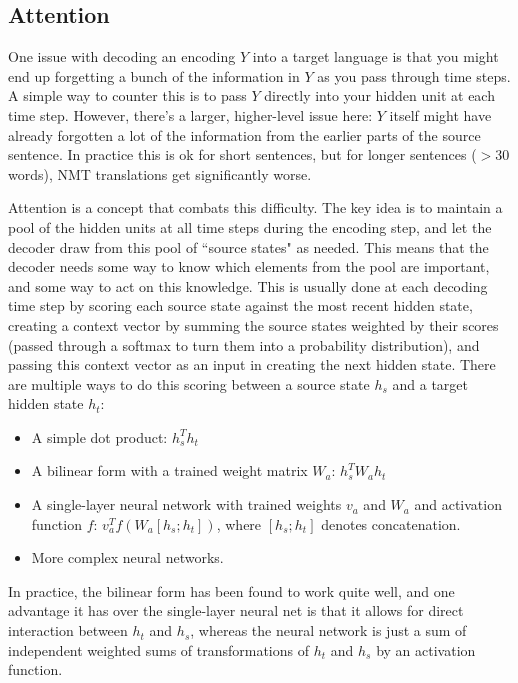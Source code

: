 \subsection{Attention}
One issue with decoding an encoding $Y$ into a target language is that you might end up forgetting a bunch of the information in $Y$ as you pass through time steps. A simple way to counter this is to pass $Y$ directly into your hidden unit at each time step. However, there's a larger, higher-level issue here: $Y$ itself might have already forgotten a lot of the information from the earlier parts of the source sentence. In practice this is ok for short sentences, but for longer sentences ($>$30 words), NMT translations get significantly worse.

Attention is a concept that combats this difficulty. The key idea is to maintain a pool of the hidden units at all time steps during the encoding step, and let the decoder draw from this pool of ``source states" as needed. This means that the decoder needs some way to know which elements from the pool are important, and some way to act on this knowledge. This is usually done at each decoding time step by scoring each source state against the most recent hidden state, creating a context vector by summing the source states weighted by their scores (passed through a softmax to turn them into a probability distribution), and passing this context vector as an input in creating the next hidden state. There are multiple ways to do this scoring between a source state $h_s$ and a target hidden state $h_t$:
\begin{itemize}
\item A simple dot product: $h_s^T h_t$
\item A bilinear form with a trained weight matrix $W_a$: $h_s^TW_ah_t$
\item A single-layer neural network with trained weights $v_a$ and $W_a$ and activation function $f$: $v_a^Tf\left(W_a[h_s; h_t]\right)$, where $[h_s; h_t]$ denotes concatenation.
\item More complex neural networks.
\end{itemize}
In practice, the bilinear form has been found to work quite well, and one advantage it has over the single-layer neural net is that it allows for direct interaction between $h_t$ and $h_s$, whereas the neural network is just a sum of independent weighted sums of transformations of $h_t$ and $h_s$ by an activation function.

